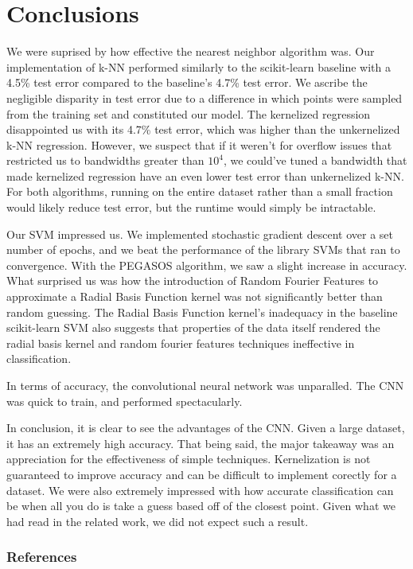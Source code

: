 \documentclass{article} %
\begin{document}
\section{Conclusions}
We were suprised by how effective the nearest neighbor algorithm was.
Our implementation of k-NN performed similarly to the scikit-learn baseline
with a 4.5\% test error compared to the baseline's 4.7\% test error. We ascribe the negligible
disparity in test error due to a difference in which points were sampled from the training set
and constituted our model. The kernelized regression disappointed us with its 4.7\% test error,
which was higher than the unkernelized k-NN regression. However, we suspect
that if it weren't for overflow issues that restricted us to bandwidths greater than $10^4$, 
we could've tuned a bandwidth that made kernelized regression have an even lower test error than
unkernelized k-NN. For both algorithms, running on the entire dataset rather than a
small fraction would likely reduce test error, but the runtime would simply be intractable.

Our SVM impressed us. We implemented stochastic gradient descent over a set
number of epochs, and we beat the performance of the library SVMs that ran to convergence. With the
PEGASOS algorithm, we saw a slight increase in accuracy. What surprised us was how the introduction
of Random Fourier Features to approximate a Radial Basis Function kernel was not 
significantly better than random guessing. The Radial Basis Function kernel's inadequacy in the baseline
scikit-learn SVM also suggests that properties of the data itself rendered the radial
basis kernel and random fourier features techniques ineffective in classification.

In terms of accuracy, the convolutional neural network was unparalled. The CNN
was quick to train, and performed spectacularly.

In conclusion, it is clear to see the advantages of the CNN. Given a large
dataset, it has an extremely high accuracy. That being said, the major takeaway
was an appreciation for the effectiveness of simple techniques.
Kernelization is not guaranteed to improve accuracy and can be difficult to implement
corectly for a dataset. We were also extremely impressed with how accurate
classification can be when all you do is take a guess based off of the closest
point. Given what we had read in the related work, we did not expect such a result.

\subsubsection*{References}
\end{document}
